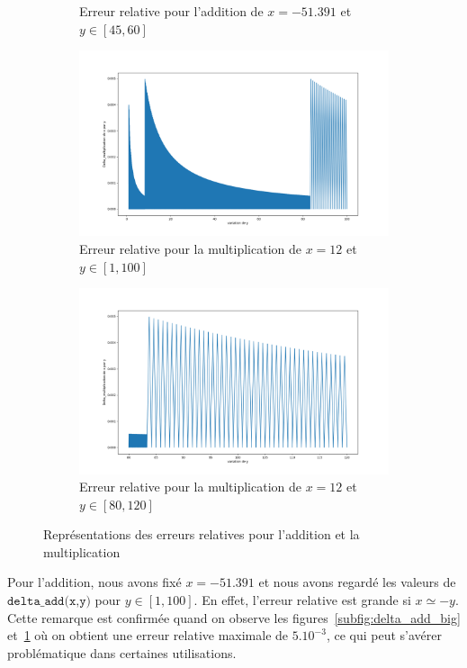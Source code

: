 \documentclass{article}
\begin{document}
\begin{figure}[ht]
\begin{subfigure}[b]{0.5\textwidth}
    \caption{Erreur relative pour l'addition de $x = -51.391$ et $y\in[45,60]$}
    \label{subfig:delta_add_zoom}
  \end{subfigure}
  \begin{subfigure}[b]{0.5\textwidth}
    \centering
      \includegraphics[width=\linewidth]{Partie1-delta_mult_1-100.png}
      \caption{Erreur relative pour la multiplication de $x = 12$ et $y\in[1,100]$}
      \label{subfig:delta_multi_big}
  \end{subfigure}
  \begin{subfigure}[b]{0.5\textwidth}
    \centering
    \includegraphics[width=\linewidth]{Partie1-delta_mult_80-120.png}
    \caption{Erreur relative pour la multiplication de $x = 12$ et $y\in[80,120]$}
    \label{subfig:delta_mult_zoom}
    \end{subfigure}
  \caption{Représentations des erreurs relatives pour l'addition et la multiplication}
  \label{fig:relative_error}
\end{figure}

Pour l'addition, nous avons fixé $x = -51.391$ et nous avons regardé les valeurs de $\texttt{delta\_add(x,y)}$ pour $y\in[1,100]$. En effet, l’erreur relative est grande si $x\simeq -y$. Cette remarque est confirmée quand on observe les figures~\ref{subfig:delta_add_big} et~\ref{subfig:delta_add_zoom} où on obtient une erreur relative maximale de $5.10^{-3}$, ce qui peut s'avérer problématique dans certaines utilisations.
\end{document}

